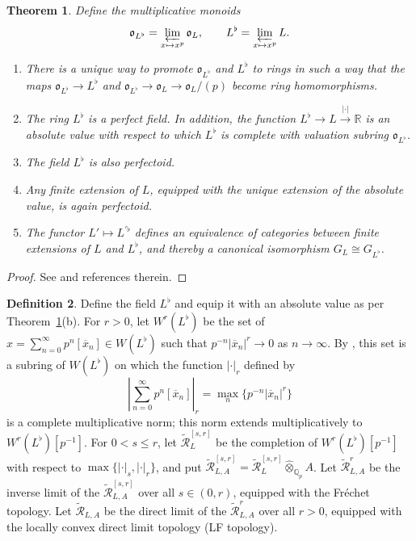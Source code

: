 \documentclass[12pt]{amsart}
\newtheorem{theorem}{Theorem}[section]
\theoremstyle{definition}
\newtheorem{defn}[theorem]{Definition}
\numberwithin{equation}{theorem}
\newcommand{\QQ}{\mathbb{Q}}
\newcommand{\RR}{\mathbb{R}}
\newcommand{\calR}{\mathcal{R}}
\newcommand{\frako}{\mathfrak{o}}
\begin{document}
\begin{theorem} \label{T:perfectoid}
Define the multiplicative monoids
\[
\frako_{L^{\flat}} = \varprojlim_{x \mapsto x^p} \frako_L, \qquad
L^{\flat} = \varprojlim_{x \mapsto x^p} L.
\]
\begin{enumerate}
\item[(a)]
There is a unique way to promote $\frako_{L^{\flat}}$ and $L^{\flat}$ to rings
in such a way that the maps $\frako_{L^{\flat}} \to L^{\flat}$ and $\frako_{L^{\flat}} \to \frako_L \to \frako_L/(p)$ become ring homomorphisms.
\item[(b)]
The ring $L^{\flat}$ is a perfect field. In addition,
the function $L^{\flat} \to L \stackrel{\left| \cdot \right|}{\to} \RR$ is an absolute value with respect to which $L^{\flat}$ is complete with valuation subring $\frako_{L^{\flat}}$.

\item[(c)]
The field $L^\flat$ is also perfectoid.
\item[(d)]
Any finite extension of $L$, equipped with the unique extension of the absolute value, is again perfectoid.
\item[(e)]
The functor $L' \mapsto L^{\prime \flat}$ defines an equivalence of categories between finite extensions of $L$ and $L^{\flat}$, and thereby a canonical isomorphism $G_L \cong G_{L^{\flat}}$.
\end{enumerate}
\end{theorem}
\begin{proof}
See \cite[\S 1]{kedlaya-new-phigamma} and references therein.
\end{proof}

\begin{defn}
Define the field $L^\flat$ and equip it with an absolute value as per
Theorem~\ref{T:perfectoid}(b). 
For $r>0$, let $W^r(L^\flat)$ be the set of $x = \sum_{n=0}^\infty p^n [\overline{x}_n] \in W(L^\flat)$ such that $p^{-n} \left| \overline{x}_n \right|^r \to 0$ as $n \to \infty$.
By \cite[Proposition~5.1.2]{kedlaya-liu1}, this set is a subring of $W(L^\flat)$ on which 
the function $\left| \cdot \right|_r$ defined by
\[
\left| \sum_{n=0}^\infty p^n [\overline{x}_n]  \right|_r = \max_n \{p^{-n} \left| \overline{x}_n \right|^r\}
\]
is a complete multiplicative norm; this norm extends multiplicatively to $W^r(L^\flat)[p^{-1}]$.
For $0 < s \leq r$, let $\tilde{\calR}^{[s,r]}_L$ be the completion of $W^r(L^\flat)[p^{-1}]$
with respect to $\max\{\left| \cdot \right|_s, \left| \cdot \right|_r\}$,
and put $\tilde{\calR}^{[s,r]}_{L,A} = \tilde{\calR}^{[s,r]}_L \widehat{\otimes}_{\QQ_p} A$.
Let $\tilde{\calR}^r_{L,A}$ be the inverse limit of the $\tilde{\calR}^{[s,r]}_{L,A}$ over all $s \in (0,r)$, equipped with the Fr\'echet topology. Let $\tilde{\calR}_{L,A}$ be the direct  limit of the $\tilde{\calR}^r_{L,A}$ over all $r>0$, equipped with the locally convex direct limit topology (LF topology).
\end{defn}
\end{document}
